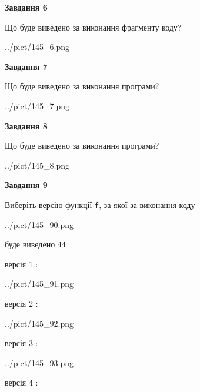 \documentclass[12pt, ukrainian]{article}
\def\code#1{\Verb!#1!}
\begin{document}
{\begin {large}
{\begin {center}\textbf{Завдання 6}\end {center}}

Що буде виведено за виконання фрагменту коду?\par
\begin{center}
	{../pict/145_6.png}
\end{center}
\newpage

{\begin {center}\textbf{Завдання 7}\end {center}}

Що буде виведено за виконання програми?\par
\begin{center}
	{../pict/145_7.png}
\end{center}
\newpage

{\begin {center}\textbf{Завдання 8}\end {center}}

Що буде виведено за виконання програми?\par
\begin{center}
	{../pict/145_8.png}
\end{center}
\newpage

{\begin {center}\textbf{Завдання 9}\end {center}}

Виберіть версію функції \code{f}, за якої за виконання коду
\begin{center}
	{../pict/145_90.png}
\end{center}
буде виведено 44

\vspace{5mm}
версія 1 :

\begin{center}
	{../pict/145_91.png}
\end{center}
версія 2 :

\begin{center}
	{../pict/145_92.png}
\end{center}
версія 3 :

\begin{center}
	{../pict/145_93.png}
\end{center}
версія 4 :


\end{large}}
\end{document}
